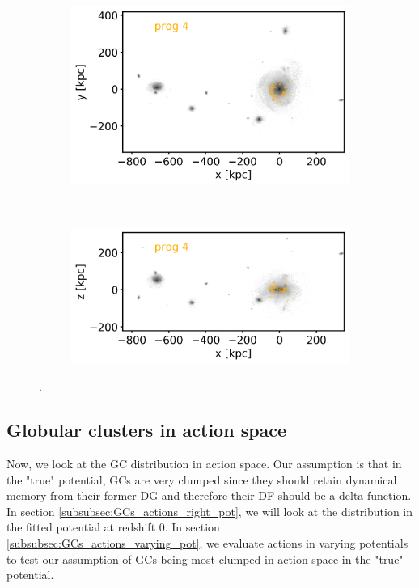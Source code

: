 \begin{figure}[htbp]
    \begin{subfigure}[c]{0.45\textwidth}
    \centering
    	\includegraphics[width=\textwidth]{plots/Dynamics/dist/xy_dist_selected_GCs_prog_4_snap_127.png}
    	\label{fig:prog4_xy}
    \end{subfigure}
    ~ %
    \begin{subfigure}[c]{0.45\textwidth}
        \centering
    	\includegraphics[width=\textwidth]{plots/Dynamics/dist/xz_dist_selected_GCs_prog_4_snap_127.png}
	    \label{fig:prog4_xz}
    \end{subfigure}
    \caption{.}\label{fig:progenitors_distribution}
\end{figure}


\subsection{Globular clusters in action space}\label{subsec:GCs_action_space}
Now, we look at the \ac{GC} distribution in action space. Our assumption is that in the "true" potential, \acp{GC} are very clumped since they should retain dynamical memory from their former \ac{DG} and therefore their \ac{DF} should be a delta function. In section \ref{subsubsec:GCs_actions_right_pot}, we will look at the distribution in the fitted potential at redshift 0. In section \ref{subsubsec:GCs_actions_varying_pot}, we evaluate actions in varying potentials to test our assumption of \acp{GC} being most clumped in action space in the "true" potential. 

